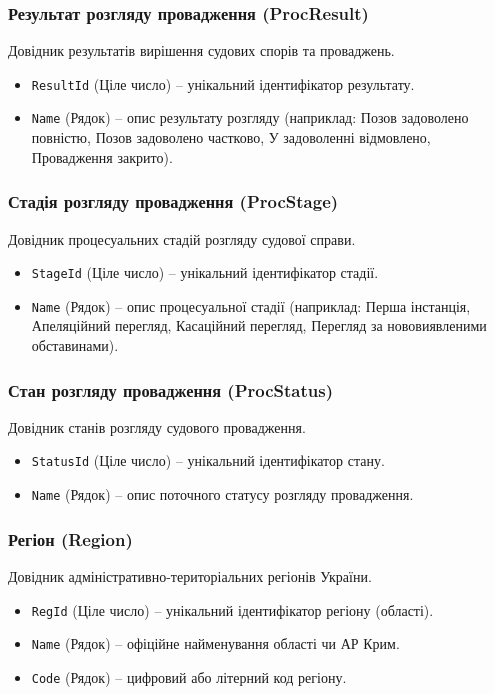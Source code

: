 \documentclass{article}
\begin{document}
\subsubsection{Результат розгляду провадження (ProcResult)}
Довідник результатів вирішення судових спорів та проваджень.
\begin{itemize}
    \item \texttt{ResultId} (Ціле число) -- унікальний ідентифікатор результату.
    \item \texttt{Name} (Рядок) -- опис результату розгляду (наприклад: Позов задоволено повністю, Позов задоволено частково, У задоволенні відмовлено, Провадження закрито).
\end{itemize}

\subsubsection{Стадія розгляду провадження (ProcStage)}
Довідник процесуальних стадій розгляду судової справи.
\begin{itemize}
    \item \texttt{StageId} (Ціле число) -- унікальний ідентифікатор стадії.
    \item \texttt{Name} (Рядок) -- опис процесуальної стадії (наприклад: Перша інстанція, Апеляційний перегляд, Касаційний перегляд, Перегляд за нововиявленими обставинами).
\end{itemize}

\subsubsection{Стан розгляду провадження (ProcStatus)}
Довідник станів розгляду судового провадження.
\begin{itemize}
    \item \texttt{StatusId} (Ціле число) -- унікальний ідентифікатор стану.
    \item \texttt{Name} (Рядок) -- опис поточного статусу розгляду провадження.
\end{itemize}

\subsubsection{Регіон (Region)}
Довідник адміністративно-територіальних регіонів України.
\begin{itemize}
    \item \texttt{RegId} (Ціле число) -- унікальний ідентифікатор регіону (області).
    \item \texttt{Name} (Рядок) -- офіційне найменування області чи АР Крим.
    \item \texttt{Code} (Рядок) -- цифровий або літерний код регіону.
\end{itemize}
\end{document}
